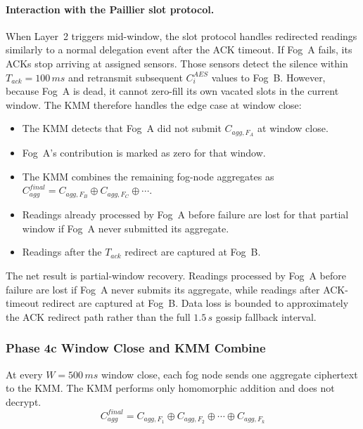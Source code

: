 \documentclass[conference]{IEEEtran}
\begin{document}
    \paragraph{Interaction with the Paillier slot protocol.}
    When Layer~2 triggers mid-window, the slot protocol handles redirected readings similarly to a normal delegation event after the ACK timeout. If Fog~A fails, its ACKs stop arriving at assigned sensors. Those sensors detect the silence within $T_{ack}=100\,ms$ and retransmit subsequent $C_i^{AES}$ values to Fog~B. However, because Fog~A is dead, it cannot zero-fill its own vacated slots in the current window. The KMM therefore handles the edge case at window close:

    \begin{itemize}
        \item The KMM detects that Fog~A did not submit $C_{agg,F_A}$ at window close.
        \item Fog~A's contribution is marked as zero for that window.
        \item The KMM combines the remaining fog-node aggregates as $C_{agg}^{final}=C_{agg,F_B}\oplus C_{agg,F_C}\oplus\cdots$.
        \item Readings already processed by Fog~A before failure are lost for that partial window if Fog~A never submitted its aggregate.
        \item Readings after the $T_{ack}$ redirect are captured at Fog~B.
    \end{itemize}

    The net result is partial-window recovery. Readings processed by Fog~A before failure are lost if Fog~A never submits its aggregate, while readings after ACK-timeout redirect are captured at Fog~B. Data loss is bounded to approximately the ACK redirect path rather than the full $1.5\,s$ gossip fallback interval.

    \subsubsection{\textbf{Phase 4c Window Close and KMM Combine}}

    At every $W=500\,ms$ window close, each fog node sends one aggregate ciphertext to the KMM. The KMM performs only homomorphic addition and does not decrypt.
    \begin{equation}
    C_{agg}^{final} = C_{agg,F_1} \oplus C_{agg,F_2} \oplus \cdots \oplus C_{agg,F_k}
    \end{equation}
\end{document}
